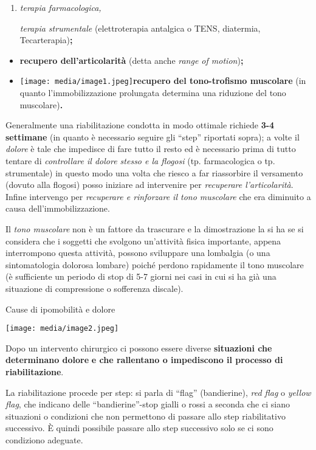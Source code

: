 \documentclass[]{article}
\begin{document}
\begin{enumerate}
\def\labelenumi{\arabic{enumi}.}
\item
  \emph{terapia farmacologica,}

  \emph{terapia strumentale} (elettroterapia antalgica o TENS,
  diatermia, Tecarterapia)\textbf{;}
\end{enumerate}

\begin{itemize}
\item
  \textbf{recupero dell'articolarità} (detta anche \emph{range of
  motion})\textbf{;}
\item
  \texttt{[image: media/image1.jpeg]}\textbf{recupero
  del tono-trofismo muscolare} (in quanto l'immobilizzazione prolungata
  determina una riduzione del tono muscolare)\textbf{.}
\end{itemize}

Generalmente una riabilitazione condotta in modo ottimale richiede
\textbf{3-4 settimane} (in quanto è necessario seguire gli ``step''
riportati sopra); a volte il \emph{dolore} è tale che impedisce di fare
tutto il resto ed è necessario prima di tutto tentare di
\emph{controllare il dolore stesso e la flogosi} (tp. farmacologica o
tp. strumentale) in questo modo una volta che riesco a far riassorbire
il versamento (dovuto alla flogosi) posso iniziare ad intervenire per
\emph{recuperare l'articolarità}. Infine intervengo per \emph{recuperare
e rinforzare il tono muscolare} che era diminuito a causa
dell'immobilizzazione.

Il \emph{tono muscolare} non è un fattore da trascurare e la
dimostrazione la si ha se si considera che i soggetti che svolgono
un'attività fisica importante, appena interrompono questa attività,
possono sviluppare una lombalgia (o una sintomatologia dolorosa lombare)
poiché perdono rapidamente il tono muscolare (è sufficiente un periodo
di stop di 5-7 giorni nei casi in cui si ha già una situazione di
compressione o sofferenza discale).

Cause di ipomobilità e dolore

\texttt{[image: media/image2.jpeg]}

Dopo un intervento chirurgico ci possono essere diverse
\textbf{situazioni che determinano dolore} \textbf{e che rallentano o
impediscono il processo di riabilitazione}.

La riabilitazione procede per step: si parla di ``flag'' (bandierine),
\emph{red flag} o \emph{yellow flag}, che indicano delle
``bandierine''-stop gialli o rossi a seconda che ci siano situazioni o
condizioni che non permettono di passare allo step riabilitativo
successivo. È quindi possibile passare allo step successivo solo se ci
sono condiziono adeguate.
\end{document}
